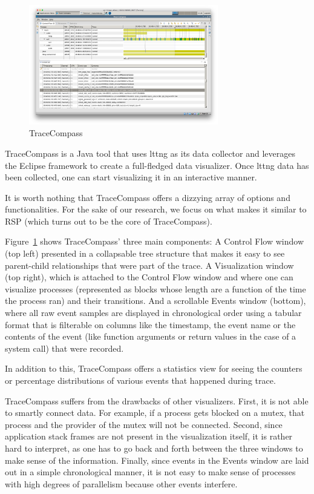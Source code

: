 \documentclass[10pt]{article}
\begin{document}
\begin{figure}[h]
\includegraphics[width=3.25in]{images/tracecompass}
\caption{TraceCompass}
\label{fig:traceCompass}
\end{figure}

TraceCompass\cite{traceCompass} is a Java tool that uses lttng as its data
collector and leverages the Eclipse framework to create a full-fledged data
visualizer. Once lttng data has been collected, one can start visualizing it in
an interactive manner.

It is worth nothing that TraceCompass offers a dizzying array of options
and functionalities. For the sake of our research, we focus on what makes
it similar to RSP (which turns out to be the core of TraceCompass).

Figure~\ref{fig:traceCompass} shows TraceCompass' three main components: A
Control Flow window (top left) presented in a collapsable tree structure that
makes it easy to see parent-child relationships that were part of the trace. A
Visualization window (top right), which is attached to the Control Flow window
and where one can visualize processes (represented as blocks whose length are a
function of the time the process ran) and their transitions. And a scrollable
Events window (bottom), where all raw event samples are displayed in
chronological order using a tabular format that is filterable on columns like
the timestamp, the event name or the contents of the event (like function
arguments or return values in the case of a system call) that were recorded.

In addition to this, TraceCompass offers a statistics view for seeing the
counters or percentage distributions of various events that happened during trace.

TraceCompass suffers from the drawbacks of other visualizers. First, it is not
able to smartly connect data. For example, if a process gets blocked
on a mutex, that process and the provider of the mutex will not be connected.
Second, since application stack frames are not present in the visualization
itself, it is rather hard to interpret, as one has to go back and forth between
the three windows to make sense of the information. Finally, since events in
the Events window are laid out in a simple chronological manner, it is not easy
to make sense of processes with high degrees of parallelism because other
events interfere.
\end{document}
